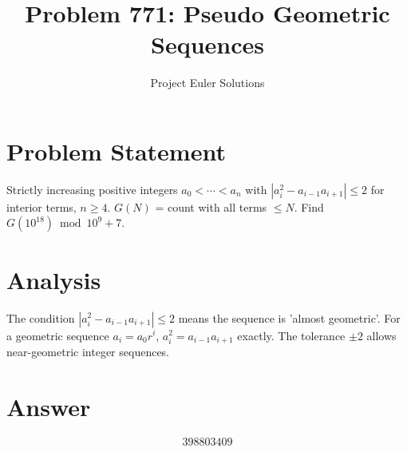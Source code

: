 \documentclass[11pt]{article}
\title{Problem 771: Pseudo Geometric Sequences}
\author{Project Euler Solutions}
\date{}
\begin{document}
\maketitle


\section{Problem Statement}
Strictly increasing positive integers $a_0<\cdots<a_n$ with $|a_i^2-a_{{i-1}}a_{{i+1}}|\le 2$ for interior terms, $n\ge 4$. $G(N)$ = count with all terms $\le N$. Find $G(10^{{18}}) \bmod 10^9+7$.

\section{Analysis}
The condition $|a_i^2-a_{{i-1}}a_{{i+1}}|\le 2$ means the sequence is 'almost geometric'. For a geometric sequence $a_i = a_0 r^i$, $a_i^2 = a_{{i-1}}a_{{i+1}}$ exactly. The tolerance $\pm 2$ allows near-geometric integer sequences.

\section{Answer}

\[
\boxed{398803409}
\]
\end{document}
